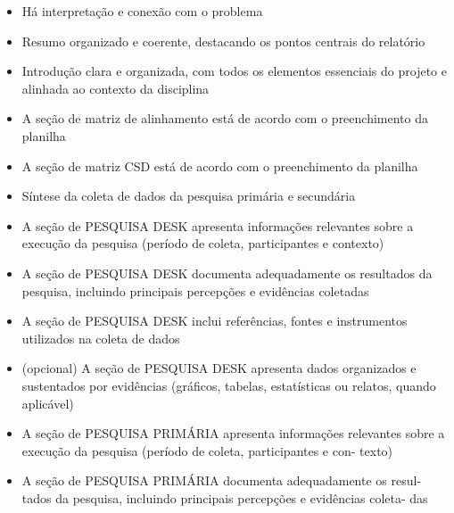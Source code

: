 \documentclass[
  sigconf,
  nonacm, %
  language=portuguese
]{acmart}
\begin{document}
\begin{itemize}[leftmargin=14pt,itemsep=1pt,topsep=3pt,parsep=0pt]
  \item[\textcolor{cgood}{$\checkmark$}] {\small\textcolor{cgood}{Há interpretação e conexão com o problema}}
  \item[\textcolor{cgood}{$\checkmark$}] {\small\textcolor{cgood}{Resumo organizado e coerente, destacando os pontos centrais do relatório}}
  \item[\textcolor{cgood}{$\checkmark$}] {\small\textcolor{cgood}{Introdução clara e organizada, com todos os elementos essenciais do projeto e alinhada ao contexto da disciplina}}
  \item[\textcolor{cgood}{$\checkmark$}] {\small\textcolor{cgood}{A seção de matriz de alinhamento está de acordo com o preenchimento da planilha}}
  \item[\textcolor{cgood}{$\checkmark$}] {\small\textcolor{cgood}{A seção de matriz CSD está de acordo com o preenchimento da planilha}}
  \item[\textcolor{cgood}{$\checkmark$}] {\small\textcolor{cgood}{Síntese da coleta de dados da pesquisa primária e secundária}}
  \item[\textcolor{cgood}{$\checkmark$}] {\small\textcolor{cgood}{A seção de PESQUISA DESK apresenta informações relevantes sobre a execução da pesquisa (período de coleta, participantes e contexto)}}
  \item[\textcolor{cgood}{$\checkmark$}] {\small\textcolor{cgood}{A seção de PESQUISA DESK documenta adequadamente os resultados da pesquisa, incluindo principais percepções e evidências coletadas}}
  \item[\textcolor{cgood}{$\checkmark$}] {\small\textcolor{cgood}{A seção de PESQUISA DESK inclui referências, fontes e instrumentos utilizados na coleta de dados}}
  \item[\textcolor{cgood}{$\checkmark$}] {\small\textcolor{cgood}{(opcional) A seção de PESQUISA DESK apresenta dados organizados e sustentados por evidências (gráficos, tabelas, estatísticas ou relatos, quando aplicável)}}
  \item[\textcolor{cgood}{$\checkmark$}] {\small\textcolor{cgood}{A seção de PESQUISA PRIMÁRIA apresenta informações relevantes  sobre a execução da pesquisa (período de coleta, participantes e con- texto)}}
  \item[\textcolor{cgood}{$\checkmark$}] {\small\textcolor{cgood}{A seção de PESQUISA PRIMÁRIA documenta adequadamente os resul- tados da pesquisa, incluindo principais percepções e evidências coleta- das}}

\end{itemize}
\end{document}

